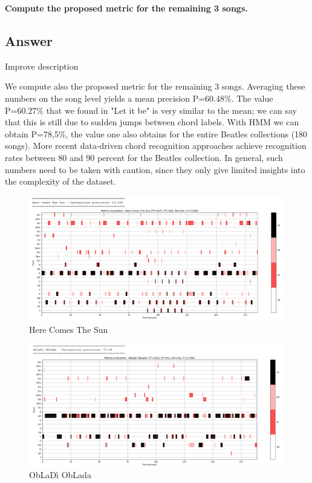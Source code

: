 \documentclass[
	12pt, %
]{fphw}
\begin{document}
\begin{problem}
	\textbf{Compute the proposed metric for the remaining 3 songs.}
\end{problem}

\subsection*{\color{blue}Answer}
\color{red}Improve description\color{black}

We compute also the proposed metric for the remaining 3 songs.
Averaging these numbers on the song level yields a mean precision P=60.48\%. The value P=60.27\% that we found in "Let it be" is very similar to the mean; we can say that this is still due to sudden jumps between chord labels. With HMM we can obtain P=78,5\%, the value one also obtains for the entire Beatles collections (180 songs). More recent data-driven chord recognition approaches achieve recognition rates between 80 and 90 percent for the Beatles collection. In general, such numbers need to be taken with caution, since they only give limited insights into the complexity of the dataset.

\begin{figure}[H]
 \centering
 \includegraphics[scale=1]{./images/4_here_comes_the_sun_metrics.png}
 \caption{Here Comes The Sun}
\end{figure}

\begin{figure}[H]
 \centering
 \includegraphics[scale=1]{./images/4_obladi_oblada_metrics.png}
 \caption{ObLaDì ObLada}
\end{figure}
\end{document}

